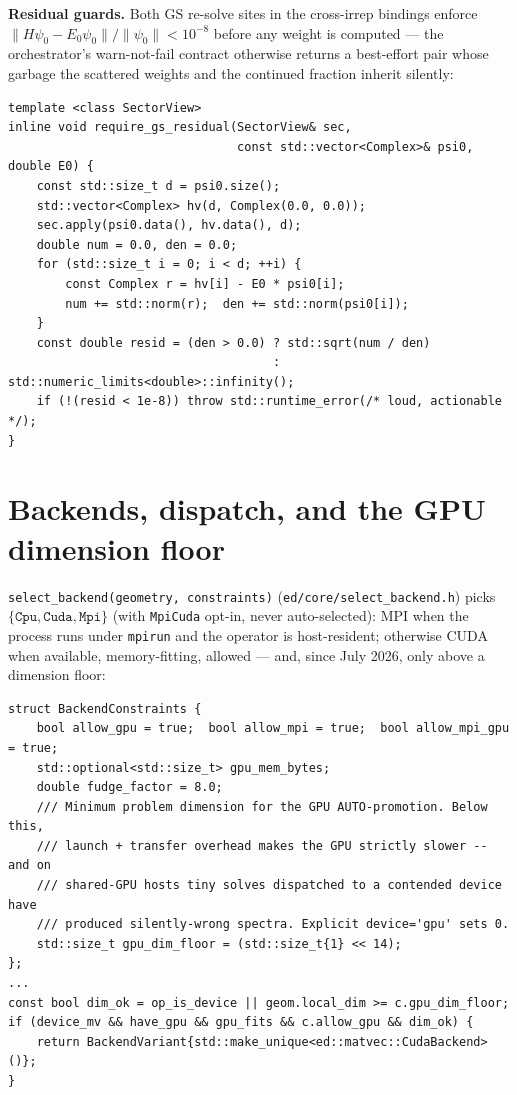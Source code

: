 \documentclass[11pt]{article}
\newcommand{\file}[1]{\texttt{\small #1}}
\begin{document}
\textbf{Residual guards.} Both GS re-solve sites in the cross-irrep
bindings enforce
$\lVert H\psi_0 - E_0 \psi_0\rVert / \lVert\psi_0\rVert < 10^{-8}$ before
any weight is computed --- the orchestrator's warn-not-fail contract
otherwise returns a best-effort pair whose garbage the scattered weights
and the continued fraction inherit silently:

\begin{lstlisting}
template <class SectorView>
inline void require_gs_residual(SectorView& sec,
                                const std::vector<Complex>& psi0, double E0) {
    const std::size_t d = psi0.size();
    std::vector<Complex> hv(d, Complex(0.0, 0.0));
    sec.apply(psi0.data(), hv.data(), d);
    double num = 0.0, den = 0.0;
    for (std::size_t i = 0; i < d; ++i) {
        const Complex r = hv[i] - E0 * psi0[i];
        num += std::norm(r);  den += std::norm(psi0[i]);
    }
    const double resid = (den > 0.0) ? std::sqrt(num / den)
                                     : std::numeric_limits<double>::infinity();
    if (!(resid < 1e-8)) throw std::runtime_error(/* loud, actionable */);
}
\end{lstlisting}

\section{Backends, dispatch, and the GPU dimension floor}
\label{sec:backends}

\texttt{select\_backend(geometry, constraints)}
(\file{ed/core/select\_backend.h}) picks
$\{\texttt{Cpu}, \texttt{Cuda}, \texttt{Mpi}\}$ (with \texttt{MpiCuda}
opt-in, never auto-selected): MPI when the process runs under
\texttt{mpirun} and the operator is host-resident; otherwise CUDA when
available, memory-fitting, allowed --- and, since July 2026, only above a
dimension floor:

\begin{lstlisting}
struct BackendConstraints {
    bool allow_gpu = true;  bool allow_mpi = true;  bool allow_mpi_gpu = true;
    std::optional<std::size_t> gpu_mem_bytes;
    double fudge_factor = 8.0;
    /// Minimum problem dimension for the GPU AUTO-promotion. Below this,
    /// launch + transfer overhead makes the GPU strictly slower -- and on
    /// shared-GPU hosts tiny solves dispatched to a contended device have
    /// produced silently-wrong spectra. Explicit device='gpu' sets 0.
    std::size_t gpu_dim_floor = (std::size_t{1} << 14);
};
...
const bool dim_ok = op_is_device || geom.local_dim >= c.gpu_dim_floor;
if (device_mv && have_gpu && gpu_fits && c.allow_gpu && dim_ok) {
    return BackendVariant{std::make_unique<ed::matvec::CudaBackend>()};
}
\end{lstlisting}
\end{document}

